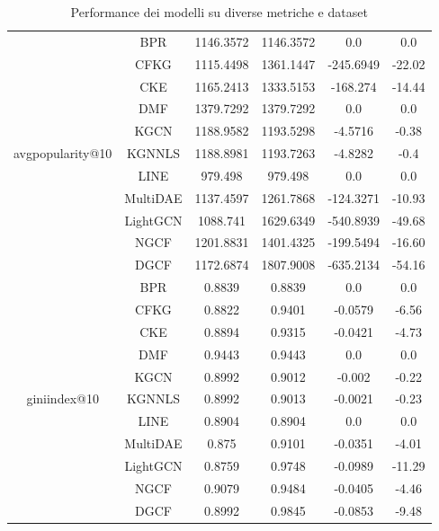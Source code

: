 \begin{table}[H]
{\begin{tabular}{|c|c|c|c|c|c|}
        \multirow{11}{*}{avgpopularity@10} 
            & BPR & 1146.3572 & 1146.3572 & 0.0 & 0.0 \\ \cline{2-6} 
            & CFKG & 1115.4498 & 1361.1447 & -245.6949 & -22.02 \\ \cline{2-6} 
            & CKE & 1165.2413 & 1333.5153 & -168.274 & -14.44 \\ \cline{2-6} 
            & DMF & 1379.7292 & 1379.7292 & 0.0 & 0.0 \\ \cline{2-6} 
            & KGCN & 1188.9582 & 1193.5298 & -4.5716 & -0.38 \\ \cline{2-6} 
            & KGNNLS & 1188.8981 & 1193.7263 & -4.8282 & -0.4 \\ \cline{2-6} 
            & LINE & 979.498 & 979.498 & 0.0 & 0.0 \\ \cline{2-6} 
            & MultiDAE & 1137.4597 & 1261.7868 & -124.3271 & -10.93 \\ \cline{2-6} 
            & LightGCN & 1088.741 & 1629.6349 & -540.8939 & -49.68 \\ \cline{2-6} 
            & NGCF & 1201.8831 & 1401.4325 & -199.5494 & -16.60 \\ \cline{2-6} 
            & DGCF & 1172.6874 & 1807.9008 & -635.2134 & -54.16 \\ \hline

        \multirow{11}{*}{giniindex@10} 
            & BPR & 0.8839 & 0.8839 & 0.0 & 0.0 \\ \cline{2-6} 
            & CFKG & 0.8822 & 0.9401 & -0.0579 & -6.56 \\ \cline{2-6} 
            & CKE & 0.8894 & 0.9315 & -0.0421 & -4.73 \\ \cline{2-6} 
            & DMF & 0.9443 & 0.9443 & 0.0 & 0.0 \\ \cline{2-6} 
            & KGCN & 0.8992 & 0.9012 & -0.002 & -0.22 \\ \cline{2-6} 
            & KGNNLS & 0.8992 & 0.9013 & -0.0021 & -0.23 \\ \cline{2-6} 
            & LINE & 0.8904 & 0.8904 & 0.0 & 0.0 \\ \cline{2-6} 
            & MultiDAE & 0.875 & 0.9101 & -0.0351 & -4.01 \\ \cline{2-6} 
            & LightGCN & 0.8759 & 0.9748 & -0.0989 & -11.29 \\ \cline{2-6} 
            & NGCF & 0.9079 & 0.9484 & -0.0405 & -4.46 \\ \cline{2-6} 
            & DGCF & 0.8992 & 0.9845 & -0.0853 & -9.48 \\ \hline
    \end{tabular}
    }
    \caption{Performance dei modelli su diverse metriche e dataset}
\end{table}


